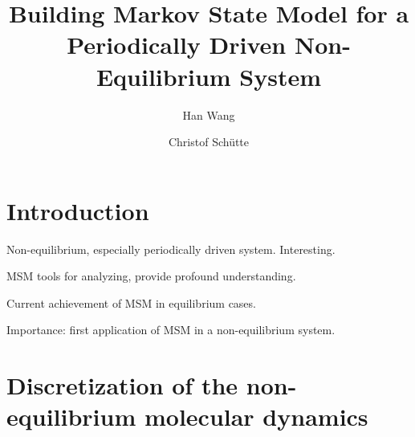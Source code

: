 \documentclass[aps, pre, preprint,unsortedaddress,a4paper,onecolumn]{revtex4}
\begin{document}
\title{Building Markov State Model for a Periodically Driven Non-Equilibrium System}
\author{Han Wang}
\author{Christof Sch\"utte}
   
\begin{abstract}
\end{abstract}

\maketitle

\section{Introduction}
Non-equilibrium, especially periodically driven system. Interesting.

MSM tools for analyzing, provide profound understanding.

Current achievement of MSM in equilibrium cases.

Importance: first application of MSM in a non-equilibrium system.

\section{Discretization of the non-equilibrium molecular dynamics}
\label{sec:disc}
\end{document}
